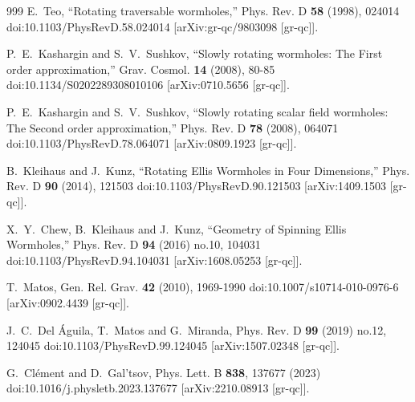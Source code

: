 \documentclass[aps,preprint,groupedaddress,nofootinbib,superscriptaddress,showkeys,showpacs,eqsecnum,amsmath,amssymb]{revtex4-1}
\begin{document}
\begin{thebibliography}{999}
E.~Teo,
``Rotating traversable wormholes,''
Phys. Rev. D \textbf{58} (1998), 024014
doi:10.1103/PhysRevD.58.024014
[arXiv:gr-qc/9803098 [gr-qc]].



P.~E.~Kashargin and S.~V.~Sushkov,
``Slowly rotating wormholes: The First order approximation,''
Grav. Cosmol. \textbf{14} (2008), 80-85
doi:10.1134/S0202289308010106
[arXiv:0710.5656 [gr-qc]].

P.~E.~Kashargin and S.~V.~Sushkov,
``Slowly rotating scalar field wormholes: The Second order approximation,''
Phys. Rev. D \textbf{78} (2008), 064071
doi:10.1103/PhysRevD.78.064071
[arXiv:0809.1923 [gr-qc]].


B.~Kleihaus and J.~Kunz,
``Rotating Ellis Wormholes in Four Dimensions,''
Phys. Rev. D \textbf{90} (2014), 121503
doi:10.1103/PhysRevD.90.121503
[arXiv:1409.1503 [gr-qc]].

X.~Y.~Chew, B.~Kleihaus and J.~Kunz,
``Geometry of Spinning Ellis Wormholes,''
Phys. Rev. D \textbf{94} (2016) no.10, 104031
doi:10.1103/PhysRevD.94.104031
[arXiv:1608.05253 [gr-qc]].

T.~Matos,
Gen. Rel. Grav. \textbf{42} (2010), 1969-1990
doi:10.1007/s10714-010-0976-6
[arXiv:0902.4439 [gr-qc]].

J.~C.~Del \'Aguila, T.~Matos and G.~Miranda,
Phys. Rev. D \textbf{99} (2019) no.12, 124045
doi:10.1103/PhysRevD.99.124045
[arXiv:1507.02348 [gr-qc]].



G.~Cl\'ement and D.~Gal'tsov,
Phys. Lett. B \textbf{838}, 137677 (2023)
doi:10.1016/j.physletb.2023.137677
[arXiv:2210.08913 [gr-qc]].



\end{thebibliography}
\end{document}

